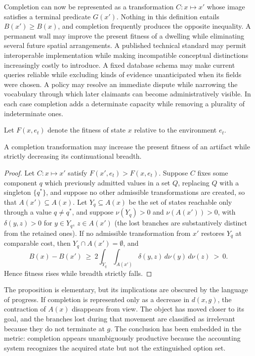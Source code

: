 Completion can now be represented as a transformation $C:x\mapsto x'$ whose image satisfies a terminal predicate $G(x')$. Nothing in this definition entails $B(x')\geq B(x)$, and completion frequently produces the opposite inequality. A permanent wall may improve the present fitness of a dwelling while eliminating several future spatial arrangements. A published technical standard may permit interoperable implementation while making incompatible conceptual distinctions increasingly costly to introduce. A fixed database schema may make current queries reliable while excluding kinds of evidence unanticipated when its fields were chosen. A policy may resolve an immediate dispute while narrowing the vocabulary through which later claimants can become administratively visible. In each case completion adds a determinate capacity while removing a plurality of indeterminate ones.

Let $F(x,e_t)$ denote the fitness of state $x$ relative to the environment $e_t$.

\begin{proposition}\label{prop:fitness-breadth}
A completion transformation may increase the present fitness of an artifact while strictly decreasing its continuational breadth.
\end{proposition}

\begin{proof}
Let $C:x\mapsto x'$ satisfy $F(x',e_t)>F(x,e_t)$. Suppose $C$ fixes some component $q$ which previously admitted values in a set $Q$, replacing $Q$ with a singleton $\{q^\ast\}$, and suppose no other admissible transformations are created, so that $A(x')\subseteq A(x)$. Let $Y_q\subseteq A(x)$ be the set of states reachable only through a value $q\neq q^\ast$, and suppose $\nu(Y_q)>0$ and $\nu(A(x'))>0$, with $\delta(y,z)>0$ for $y\in Y_q$, $z\in A(x')$ (the lost branches are substantively distinct from the retained ones). If no admissible transformation from $x'$ restores $Y_q$ at comparable cost, then $Y_q\cap A(x')=\emptyset$, and
\[
B(x)-B(x')\ \geq\ 2\int_{Y_q}\int_{A(x')}\delta(y,z)\,d\nu(y)\,d\nu(z)\ >\ 0 .
\]
Hence fitness rises while breadth strictly falls.
\end{proof}

The proposition is elementary, but its implications are obscured by the language of progress. If completion is represented only as a decrease in $d(x,g)$, the contraction of $A(x)$ disappears from view. The object has moved closer to its goal, and the branches lost during that movement are classified as irrelevant because they do not terminate at $g$. The conclusion has been embedded in the metric: completion appears unambiguously productive because the accounting system recognizes the acquired state but not the extinguished option set.

